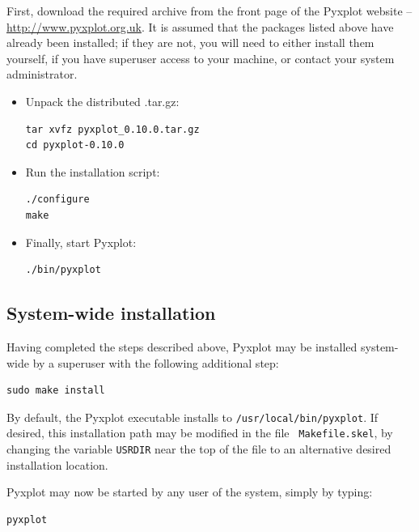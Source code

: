 First, download the required archive from the front page of the
Pyxplot website -- \url{http://www.pyxplot.org.uk}. It is assumed that the
packages listed above have already been installed; if they are not, you will
need to either install them yourself, if you have superuser access to your
machine, or contact your system administrator.

\begin{itemize}
\item Unpack the distributed .tar.gz:

\begin{verbatim}
tar xvfz pyxplot_0.10.0.tar.gz
cd pyxplot-0.10.0
\end{verbatim}

\item Run the installation script:

\begin{verbatim}
./configure
make
\end{verbatim}

\item Finally, start Pyxplot:

\begin{verbatim}
./bin/pyxplot
\end{verbatim}

\end{itemize}

\subsection{System-wide installation}

Having completed the steps described above, Pyxplot may be installed
system-wide by a superuser with the following additional
step:

\begin{verbatim}
sudo make install
\end{verbatim}

By default, the Pyxplot executable installs to {\tt /usr/local/bin/pyxplot}.
If desired, this installation path may be modified in the file {\tt
Makefile.skel}, by changing the variable {\tt USRDIR} near the top of the file to an
alternative desired installation location.

Pyxplot may now be started by any user of the system, simply by typing:

\begin{verbatim}
pyxplot
\end{verbatim}

